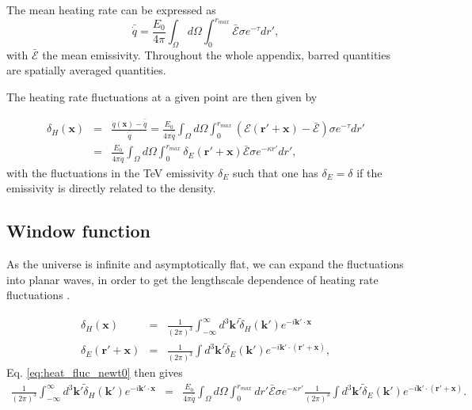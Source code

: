 \documentclass[twocolumns]{emulateapj}
\begin{document}
The mean heating rate can be expressed as
\begin{equation}
  \label{eq:heating_rate0}
  \bar{\dot{q}}=\frac{E_0}{4\pi} \int_{\Omega}d\Omega\int_0^{r_{max}}  \bar{\mathcal{E}}\sigma  e^{-\tau}dr', 
\end{equation}
with $\bar{\mathcal{E}}$ the mean emissivity. Throughout the whole appendix, barred quantities are spatially averaged quantities.

The heating rate fluctuations at a given point are then given by 

\begin{eqnarray}
  \label{eq:heat_fluc_newt0}
  \delta_H(\mathbf{x})&=&\frac{\dot{q}(\mathbf{x})-\bar{\dot{q}}}{\bar{\dot{q}}}=\frac{E_0}{4\pi\bar{\dot{q}}} \int_{\Omega}d\Omega\int_0^{r_{max}}   (\mathcal{E}(\mathbf{r}'+\mathbf{x})-\bar{\mathcal{E}}) \sigma  e^{-\tau} dr' \\ \nonumber
  &=&\frac{E_0}{4\pi\bar{\dot{q}}}\int_{\Omega}d\Omega\int_0^{r_{max}}   \delta_E(\mathbf{r}'+\mathbf{x})\bar{\mathcal{E}}\sigma  e^{-\kappa r'}dr',
\end{eqnarray}
with the fluctuations in the TeV emissivity $\delta_E$ such that one has $\delta_E=\delta$ if the emissivity is directly related to the density.



\subsection{Window function}
As the universe is infinite and asymptotically flat, we can expand the fluctuations into planar waves, in order to get the lengthscale dependence of heating rate fluctuations \citep{2004MNRAS.352..142B}.

\begin{eqnarray}
  \label{eq:FT_delta}
  \delta_H(\mathbf{x})&=&\frac{1}{(2\pi)^3}\int_{-\infty}^{\infty} d^3\mathbf{k'} \tilde{\delta}_H(\mathbf{k'}) e^{-i\mathbf{k'}\cdot\mathbf{x}}\\ \nonumber
  \delta_E(\mathbf{r}'+\mathbf{x})&=&\frac{1}{(2\pi)^3}\int d^3\mathbf{k'} \tilde{\delta}_E(\mathbf{k'}) e^{-i\mathbf{k'}\cdot(\mathbf{r'}+\mathbf{x})},
\end{eqnarray}
Eq. \ref{eq:heat_fluc_newt0} then gives
\begin{eqnarray}
  \label{eq:heat_fluc_newt1}
\frac{1}{(2\pi)^3}\int_{-\infty}^{\infty} d^3\mathbf{k'} \tilde{\delta}_H(\mathbf{k'}) e^{-i\mathbf{k'}\cdot\mathbf{x}}&=&\frac{E_0}{4\pi\bar{\dot{q}}} \int_{\Omega}d\Omega\int_0^{r_{max}}  dr' \bar{\mathcal{E}}\sigma  e^{-\kappa r'}  \frac{1}{(2\pi)^3}\int d^3\mathbf{k'} \tilde{\delta}_E(\mathbf{k'}) e^{-i\mathbf{k'}\cdot(\mathbf{r'}+\mathbf{x})}.
\end{eqnarray}
\end{document}
